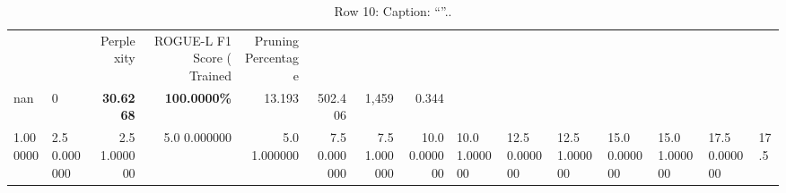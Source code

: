 \begin{table}
\caption{Row 10\ifshowcaption{}: Caption: ``''.\else.\fi}
\label{tab:evaluation-pipeline-10}
\begin{tabular}{llrrrrrr}
 &  & Perplexity & ROGUE-L F1 Score (%
Trained & Pruning Percentage &  &  &  &  &  &  \\
nan & 0 & \bfseries 30.6268 & \bfseries 100.0000\% & 13.193 & 502.406 & 1,459 & 0.344 \\
1.000000 & 2.5%
0.000000 & 2.5%
1.000000 & 5.0%
0.000000 & 5.0%
1.000000 & 7.5%
0.000000 & 7.5%
1.000000 & 10.0%
0.000000 & 10.0%
1.000000 & 12.5%
0.000000 & 12.5%
1.000000 & 15.0%
0.000000 & 15.0%
1.000000 & 17.5%
0.000000 & 17.5%

\end{tabular}
\end{table}
